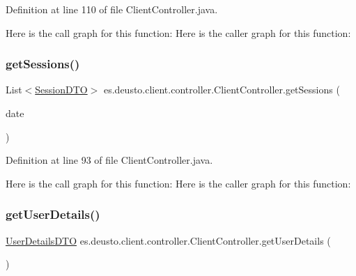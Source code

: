 Definition at line 110 of file Client\+Controller.\+java.

Here is the call graph for this function\+:
Here is the caller graph for this function\+:
\mbox{\label{classes_1_1deusto_1_1client_1_1controller_1_1_client_controller_a06a84e0834fb21c31f4988e26ee6dedf}} 
\subsubsection{\texorpdfstring{getSessions()}{getSessions()}}
{\footnotesize\ttfamily List$<$\mbox{\hyperlink{classes_1_1deusto_1_1server_1_1data_1_1_session_d_t_o}{Session\+D\+TO}}$>$ es.\+deusto.\+client.\+controller.\+Client\+Controller.\+get\+Sessions (\begin{DoxyParamCaption}\item[{Local\+Date}]{date }\end{DoxyParamCaption})}



Definition at line 93 of file Client\+Controller.\+java.

Here is the call graph for this function\+:
Here is the caller graph for this function\+:
\mbox{\label{classes_1_1deusto_1_1client_1_1controller_1_1_client_controller_ac1bd9affe27668ee49320daae38d67a0}} 
\subsubsection{\texorpdfstring{getUserDetails()}{getUserDetails()}}
{\footnotesize\ttfamily \mbox{\hyperlink{classes_1_1deusto_1_1server_1_1data_1_1_user_details_d_t_o}{User\+Details\+D\+TO}} es.\+deusto.\+client.\+controller.\+Client\+Controller.\+get\+User\+Details (\begin{DoxyParamCaption}{ }\end{DoxyParamCaption})}



